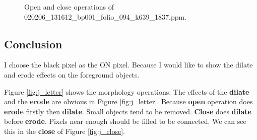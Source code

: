 \documentclass[paper=a4, fontsize=11pt]{scrartcl}
\numberwithin{equation}{section}		%
\numberwithin{figure}{section}			%
\numberwithin{table}{section}				%
\begin{document}
\begin{figure}[h]
\centering
{}
\caption{Open and close operations of 020206\_131612\_bp001\_folio\_094\_k639\_1837.ppm.}
\label{fig:morph:02}
\end{figure}

\subsection{Conclusion}

I choose the black pixel as the ON pixel.
Because I would like to show the dilate and erode effects on the foreground objects.

Figure \ref{fig:j_letter} shows the morphology operations.
The effects of the \textbf{dilate} and the \textbf{erode} are obvious in Figure \ref{fig:j_letter}.
Because \textbf{open} operation does \textbf{erode} firstly then \textbf{dilate}.
Small objects tend to be removed.
\textbf{Close} does \textbf{dilate} before \textbf{erode}.
Pixels near enough should be filled to be connected.
We can see this in the \textbf{close} of Figure \ref{fig:j_close}.
\end{document}
